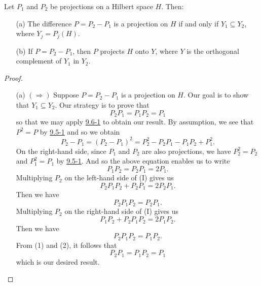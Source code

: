 \begin{theorem}\label{9.6-2}
    Let \( {P}_{1}  \) and \( {P}_{2} \) be projections on a Hilbert space \( H  \). Then:
    \begin{enumerate}
        \item[(a)] The difference \( P = {P}_{2} - {P}_{1} \) is a projection on \( H  \) if and only if \( {Y}_{1} \subseteq  {Y}_{2} \), where \( {Y}_{j} = {P}_{j}(H) \).
        \item[(b)] If \( P = {P}_{2} - {P}_{1} \), then \( P  \) projects \( H  \) onto \( Y  \), where \( Y  \) is the orthogonal complement of \( {Y}_{1} \) in \( {Y}_{2} \).
    \end{enumerate}
\end{theorem}
\begin{proof}
\begin{enumerate}
    \item[(a)] \( (\Longrightarrow) \) Suppose \( P = {P}_{2} - {P}_{1} \) is a projection on \( H  \). Our goal is to show that \( {Y}_{1} \subseteq {Y}_{2} \). Our strategy is to prove that 
        \[  {P}_{2}{P}_{1} = {P}_{1} {P}_{2} = {P}_{1} \]
        so that we may apply {\hyperref[9.6-1]{9.6-1}} to obtain our result. By assumption, we see that \( P^{2} = P  \) by {\hyperref[9.5-1]{9.5-1}} and so we obtain
        \[  {P}_{2} - {P}_{1} = ({P}_{2} - {P}_{1})^{2} = {P}_{2}^{2} - {P}_{2} {P}_{1} - {P}_{1} {P}_{2} + {P}_{1}^{2}.\]
        On the right-hand side, since \( {P}_{1} \) and \( {P}_{2} \) are also projections, we have \( {P}_{2}^{2} = {P}_{2} \) and \( {P}_{1}^{2} = {P}_{1} \) by {\hyperref[9.5-1]{9.5-1}}. And so the above equation enables us to write
        \[  {P}_{1}{P}_{2} = {P}_{2}{P}_{1} = 2 {P}_{1}. \tag{I} \]
        Multiplying \( {P}_{2} \) on the left-hand side of (I) gives us
        \[  {P}_{2}{P}_{1} {P}_{2} + {P}_{2}{P}_{1} = 2 {P}_{2} {P}_{1}. \]
        Then we have
        \[  {P}_{2} {P}_{1} {P}_{2} = {P}_{2} {P}_{1}. \tag{1} \]
        Multiplying \( {P}_{2}  \) on the right-hand side of (I) gives us
        \[ {P}_{1}{P}_{2} + {P}_{2} {P}_{1} {P}_{2} = 2 {P}_{1} {P}_{2}.  \]
        Then we have 
        \[  {P}_{2} {P}_{1} {P}_{2} = {P}_{1} {P}_{2}. \tag{2} \]
        From (1) and (2), it follows that 
        \[  {P}_{2} {P}_{1} = {P}_{1} {P}_{2} = {P}_{1} \]
        which is our desired result.
       

\end{enumerate}
\end{proof}
